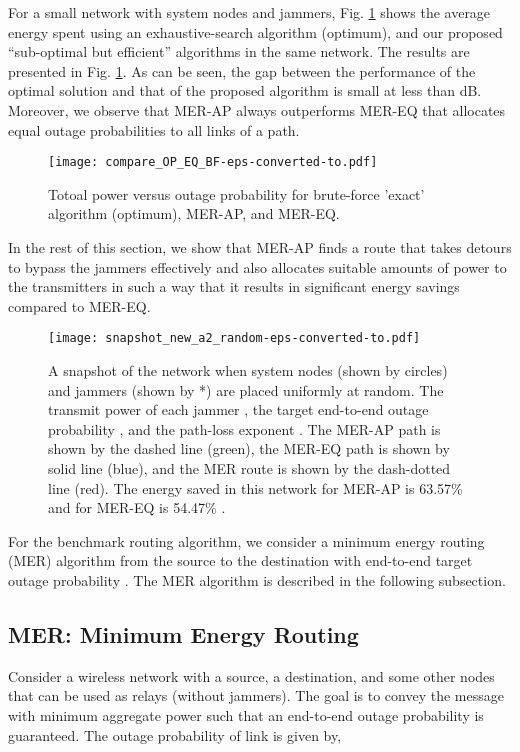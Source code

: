 \documentclass[10pt,journal]{IEEEtran}
\theoremstyle{definition}
\begin{document}
	For a small network with   system nodes and  jammers, Fig. \ref{fig:compare_OP_EQ_BF} shows the average energy spent using an exhaustive-search algorithm (optimum), and our proposed ``sub-optimal but efficient'' algorithms in the same network.
	 The results are presented in Fig. \ref{fig:compare_OP_EQ_BF}. 
	 As can be seen, the gap between the performance of the optimal solution and that of the proposed algorithm is small at less than  dB. 
	 Moreover, we observe that MER-AP always outperforms MER-EQ
	that allocates equal outage probabilities to all links of a path.

\begin{figure}
	\begin{center}
		\texttt{[image: compare\_OP\_EQ\_BF-eps-converted-to.pdf]}
	\end{center}
	\caption{{Totoal power versus outage probability for brute-force 'exact' algorithm (optimum), MER-AP, and MER-EQ.}}
	\label{fig:compare_OP_EQ_BF}
\end{figure}

In the rest of this section, we  show  that MER-AP finds a route that  takes  detours  to bypass the jammers  effectively and also allocates  suitable amounts of power to the transmitters  in such a way that it results in significant energy savings compared to MER-EQ.


\begin{figure}[h]
	\centering
	\texttt{[image: snapshot\_new\_a2\_random-eps-converted-to.pdf]}
	\caption{A snapshot of the network when  system nodes (shown by circles) and  jammers (shown by *) are placed uniformly at random. The transmit power of each jammer , the target end-to-end outage probability , and the path-loss exponent . The  MER-AP path is shown by the dashed line (green), the  MER-EQ path is shown by solid line (blue), and the MER route  is shown by the dash-dotted line (red). The  energy saved in this network for MER-AP   is 63.57\% and for MER-EQ is 54.47\% .}
	\label{fig:a2_random}
\end{figure} 

For the benchmark routing algorithm, we consider  a  minimum energy routing (MER) algorithm from the source to the destination with end-to-end target outage probability .  
The MER algorithm is described in the following subsection.

\subsection{MER: Minimum Energy Routing} \label{sec:MER}
Consider
a wireless network with a source, a destination, and some other nodes that can be used as relays (without jammers).
The goal is to convey the message with minimum
aggregate power such that an end-to-end outage probability is guaranteed. 
 The outage probability of link  is given by, 
\end{document}
